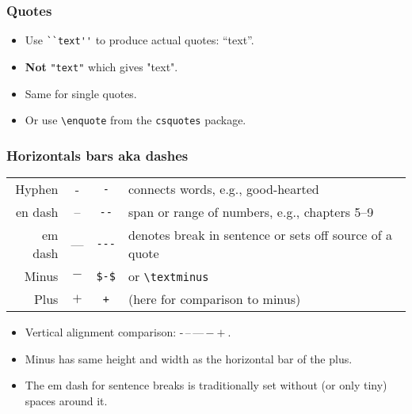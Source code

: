 \documentclass[aspectratio=1610,hyperref={colorlinks,linkcolor=}]{beamer}
\newcommand{\pkg}[1]{\texttt{#1}}
\begin{document}
\begin{frame}[fragile]
    \frametitle{Quotes}
    \begin{itemize}
        \item Use \verb+``text''+ to produce actual quotes: ``text''.
        \item \textbf{Not} \verb+"text"+ which gives "text". %
        \item Same for single quotes.
        \item Or use \verb+\enquote+ from the \pkg{csquotes} package.
    \end{itemize}
\end{frame}

\begin{frame}[fragile]
    \frametitle{Horizontals bars aka dashes}
    \begin{tabular}{rccl}
        Hyphen & - & \verb+-+ & connects words, e.g., good-hearted \\ %
        en dash & -- & \verb+--+ & span or range of numbers, e.g., chapters 5--9 \\ %
        em dash & --- & \verb+---+ & denotes break in sentence or sets off source of a quote \\
        Minus & $-$ & \verb+$-$+ & or \verb+\textminus+ \\
        Plus & $+$ & \verb$+$ & (here for comparison to minus)  \\
    \end{tabular}
    \begin{itemize}
        \item Vertical alignment comparison: {\Huge -\,--\,---\,$-+$}. %
        \item Minus has same height and width as the horizontal bar of the plus.
        \item The em dash for sentence breaks is traditionally set without (or only tiny) spaces around it.
    \end{itemize}
\end{frame}
\end{document}
